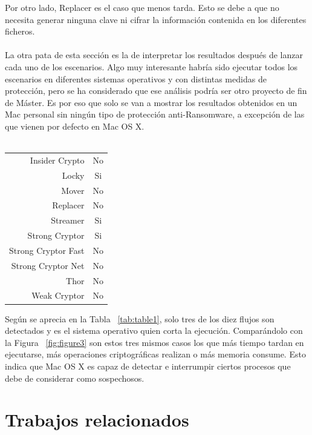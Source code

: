 \documentclass[a4paper,12pt]{article}
\begin{document}
Por otro lado, Replacer es el caso que menos tarda. Esto se debe a que no necesita generar ninguna clave ni cifrar la información contenida en los diferentes ficheros.\\\\
La otra pata de esta sección es la de interpretar los resultados después de lanzar cada uno de los escenarios. Algo muy interesante habría sido ejecutar todos los escenarios en diferentes sistemas operativos y con distintas medidas de protección, pero se ha considerado que ese análisis podría ser otro proyecto de fin de Máster. Es por eso que solo se van a mostrar los resultados obtenidos en un Mac personal sin ningún tipo de protección anti-Ransomware, a excepción de las que vienen por defecto en Mac OS X.\\\\
\begin{center}
	\begin{tabular}{ r | c }
		Insider Crypto & No \\ 
		Locky  & Si \\ 
		Mover  & No \\ 
		Replacer  & No \\ 
		Streamer  & Si \\ 
		Strong Cryptor  & Si \\ 
		Strong Cryptor Fast  & No \\ 
		Strong Cryptor Net  & No \\ 
		Thor  & No \\ 
		Weak Cryptor & No \\
	\end{tabular}
	\label{tab:table1}
\end{center}
Según se aprecia en la Tabla ~\ref{tab:table1}, solo tres de los diez flujos son detectados y es el sistema operativo quien corta la ejecución. Comparándolo con la Figura ~\ref{fig:figure3} son estos tres mismos casos los que más tiempo tardan en ejecutarse, más operaciones criptográficas realizan o más memoria consume. Esto indica que Mac OS X es capaz de detectar e interrumpir ciertos procesos que debe de considerar como sospechosos.
\newpage
\section{Trabajos relacionados}
\newpage
\end{document}
